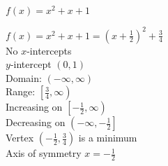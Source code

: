 {$f(x) = x^2 + x + 1$}
{$f(x) = x^2+x+1 = \left(x + \frac{1}{2}\right)^{2} + \frac{3}{4}$\\
No $x$-intercepts \\
$y$-intercept $(0, 1)$\\
Domain: $(-\infty, \infty)$ \\
Range: $\left[ \frac{3}{4}, \infty\right)$ \\
Increasing on $\left[-\frac{1}{2}, \infty\right)$ \\
Decreasing on $\left(-\infty, -\frac{1}{2}\right]$ \\
Vertex $\left(-\frac{1}{2}, \frac{3}{4}\right)$ is a minimum \\
Axis of symmetry $x = -\frac{1}{2}$ 

\begin{center}
\end{center}
}